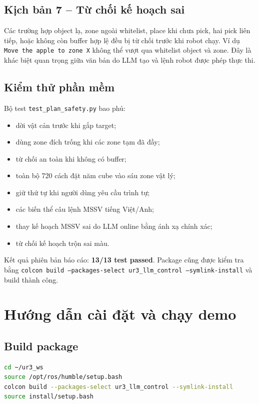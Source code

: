 \documentclass[a4paper,12pt]{article}
\newcommand{\code}[1]{\texttt{#1}}
\begin{document}
\subsection{Kịch bản 7 -- Từ chối kế hoạch sai}
Các trường hợp object lạ, zone ngoài whitelist, place khi chưa pick, hai pick
liên tiếp, hoặc không còn buffer hợp lệ đều bị từ chối trước khi robot chạy.
Ví dụ \code{Move the apple to zone X} không thể vượt qua whitelist object và
zone. Đây là khác biệt quan trọng giữa văn bản do LLM tạo và lệnh robot được
phép thực thi.

\subsection{Kiểm thử phần mềm}
Bộ test \code{test\_plan\_safety.py} bao phủ:
\begin{itemize}
  \item dời vật cản trước khi gắp target;
  \item dùng zone đích trống khi các zone tạm đã đầy;
  \item từ chối an toàn khi không có buffer;
  \item toàn bộ 720 cách đặt năm cube vào sáu zone vật lý;
  \item giữ thứ tự khi người dùng yêu cầu trình tự;
  \item các biến thể câu lệnh MSSV tiếng Việt/Anh;
  \item thay kế hoạch MSSV sai do LLM online bằng ánh xạ chính xác;
  \item từ chối kế hoạch trộn sai màu.
\end{itemize}
Kết quả phiên bản báo cáo: \textbf{13/13 test passed}. Package cũng được kiểm
tra bằng \code{colcon build --packages-select ur3\_llm\_control
--symlink-install} và build thành công.

\section{Hướng dẫn cài đặt và chạy demo}

\subsection{Build package}
\begin{lstlisting}[language=bash,caption={Build workspace ROS 2}]
cd ~/ur3_ws
source /opt/ros/humble/setup.bash
colcon build --packages-select ur3_llm_control --symlink-install
source install/setup.bash
\end{lstlisting}
\end{document}
